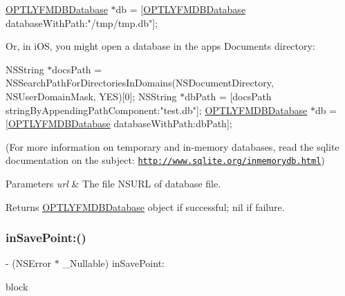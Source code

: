 \mbox{\hyperlink{interface_o_p_t_l_y_f_m_d_b_database}{O\+P\+T\+L\+Y\+F\+M\+D\+B\+Database}} $\ast$db = \mbox{[}\mbox{\hyperlink{interface_o_p_t_l_y_f_m_d_b_database}{O\+P\+T\+L\+Y\+F\+M\+D\+B\+Database}} database\+With\+Path\+:"/tmp/tmp.db"\mbox{]};

Or, in i\+OS, you might open a database in the app\textquotesingle{}s {\ttfamily Documents} directory\+:

N\+S\+String $\ast$docs\+Path = N\+S\+Search\+Path\+For\+Directories\+In\+Domains(\+N\+S\+Document\+Directory, N\+S\+User\+Domain\+Mask, Y\+E\+S)\mbox{[}0\mbox{]}; N\+S\+String $\ast$db\+Path = \mbox{[}docs\+Path string\+By\+Appending\+Path\+Component\+:"test.\+db"\mbox{]}; \mbox{\hyperlink{interface_o_p_t_l_y_f_m_d_b_database}{O\+P\+T\+L\+Y\+F\+M\+D\+B\+Database}} $\ast$db = \mbox{[}\mbox{\hyperlink{interface_o_p_t_l_y_f_m_d_b_database}{O\+P\+T\+L\+Y\+F\+M\+D\+B\+Database}} database\+With\+Path\+:db\+Path\mbox{]};

(For more information on temporary and in-\/memory databases, read the sqlite documentation on the subject\+: \href{http://www.sqlite.org/inmemorydb.html}{\tt http\+://www.\+sqlite.\+org/inmemorydb.\+html})


\begin{DoxyParams}{Parameters}
{\em url} & The file {\ttfamily N\+S\+U\+RL} of database file.\\
\hline
\end{DoxyParams}
\begin{DoxyReturn}{Returns}
{\ttfamily \mbox{\hyperlink{interface_o_p_t_l_y_f_m_d_b_database}{O\+P\+T\+L\+Y\+F\+M\+D\+B\+Database}}} object if successful; {\ttfamily nil} if failure. 
\end{DoxyReturn}
\mbox{\label{interface_o_p_t_l_y_f_m_d_b_database_a5ced1981fdf00e7f6609195c0255e71d}} 
\subsubsection{\texorpdfstring{in\+Save\+Point\+:()}{inSavePoint:()}}
{\footnotesize\ttfamily -\/ (N\+S\+Error $\ast$ \+\_\+\+Nullable) in\+Save\+Point\+: \begin{DoxyParamCaption}\item[{(\+\_\+\+\_\+attribute\+\_\+\+\_\+((noescape)) void($^\wedge$)(B\+O\+OL $\ast$\mbox{\hyperlink{interface_o_p_t_l_y_f_m_d_b_database_a511569a0ee0c82136255920ebe9d28e6}{rollback}}))}]{block }\end{DoxyParamCaption}}

